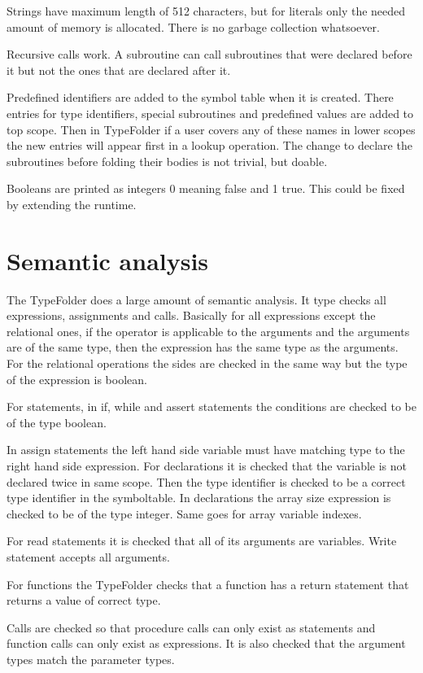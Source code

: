 \documentclass[12pt,a4paper]{article}
\begin{document}
Strings have maximum length of 512 characters, but for literals only
the needed amount of memory is allocated. There is no garbage collection
whatsoever.

Recursive calls work. A subroutine can call subroutines that were declared
before it but not the ones that are declared after it.

Predefined identifiers are added to the symbol table when it is created.  There
entries for type identifiers, special subroutines and predefined values are
added to top scope. Then in TypeFolder if a user covers any of these names in
lower scopes the new entries will appear first in a lookup operation.
The change to declare the subroutines before folding their bodies is not trivial,
but doable.

Booleans are printed as integers 0 meaning false and 1 true.
This could be fixed by extending the runtime.


\section{Semantic analysis}

The TypeFolder does a large amount of semantic analysis.  It type checks all
expressions, assignments and calls.  Basically for all expressions except the
relational ones, if the operator is applicable to the arguments and the
arguments are of the same type, then the expression has the same type as the
arguments. For the relational operations the sides are checked in the same way
but the type of the expression is boolean.

For statements, in if, while and assert statements the conditions are checked to 
be of the type boolean.

In assign statements the left hand side variable
must have matching type to the right hand side expression.
For declarations it is checked that the variable is not declared twice
in same scope. Then the type identifier is checked to be a correct type
identifier in the symboltable. 
In declarations the array size expression is checked to be of the type integer.
Same goes for array variable indexes.

For read statements it is checked that all of its arguments are
variables. Write statement accepts all arguments.

For functions the TypeFolder checks that a function has a return statement that
returns a value of correct type.

Calls are checked so that procedure calls can only
exist as statements and function calls can only exist as
expressions. It is also checked that the argument types match
the parameter types.
\end{document}
